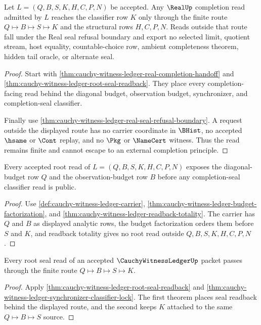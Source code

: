 \begin{theorem}
\label{thm:cauchy-witness-ledger-real-completion-nonescape}
Let $L=(Q,B,S,K,H,C,P,N)$ be accepted. Any $\RealUp$ completion read admitted by $L$ reaches the classifier row $K$ only through the finite route $Q \longmapsto B \longmapsto S \longmapsto K$ and the structural rows $H,C,P,N$. Reads outside that route fall under the Real seal refusal boundary and export no selected limit, quotient stream, host equality, countable-choice row, ambient completeness theorem, hidden tail oracle, or alternate seal.
\end{theorem}
\begin{proof}
Start with \autoref{thm:cauchy-witness-ledger-real-completion-handoff} and \autoref{thm:cauchy-witness-ledger-root-seal-readback}. They place every completion-facing read behind the diagonal budget, observation budget, synchronizer, and completion-seal classifier.

Finally use \autoref{thm:cauchy-witness-ledger-real-seal-refusal-boundary}. A request outside the displayed route has no carrier coordinate in $\BHist$, no accepted $\hsame$ or $\Cont$ replay, and no $\Pkg$ or $\NameCert$ witness. Thus the read remains finite and cannot escape to an external completion principle.
\end{proof}

\begin{theorem}\label{thm:cauchy-witness-ledger-root-budget-row-totality}
Every accepted root read of $L=(Q,B,S,K,H,C,P,N)$ exposes the diagonal-budget row $Q$ and the observation-budget row $B$ before any completion-seal classifier read is public.
\end{theorem}
\begin{proof}
Use \autoref{def:cauchy-witness-ledger-carrier}, \autoref{thm:cauchy-witness-ledger-budget-factorization}, and \autoref{thm:cauchy-witness-ledger-readback-totality}. The carrier has $Q$ and $B$ as displayed analytic rows, the budget factorization orders them before $S$ and $K$, and readback totality gives no root read outside $Q,B,S,K,H,C,P,N$.
\end{proof}

\begin{theorem}\label{thm:cauchy-witness-ledger-root-seal-route-totality}
Every root seal read of an accepted $\CauchyWitnessLedgerUp$ packet passes through the finite route $Q \longmapsto B \longmapsto S \longmapsto K$.
\end{theorem}
\begin{proof}
Apply \autoref{thm:cauchy-witness-ledger-root-seal-readback} and \autoref{thm:cauchy-witness-ledger-synchronizer-classifier-lock}. The first theorem places seal readback behind the displayed route, and the second keeps $K$ attached to the same $Q \longmapsto B \longmapsto S$ source.
\end{proof}


